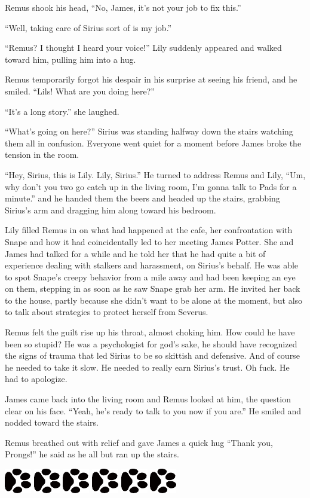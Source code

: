 \documentclass[12pt,twoside,openright]{memoir}
\newcommand{\dogPrintRule}{	
	\begin{center}
		\hspace{.5em}
		\includegraphics[angle=60]{dogprint.pdf}
		\hspace{.5em}
		\includegraphics[angle=120]{dogprint.pdf}
		\hspace{.5em}
		\includegraphics[angle=60]{dogprint.pdf}
		\hspace{.5em}
		\includegraphics[angle=120]{dogprint.pdf}
		\hspace{.5em}
		\includegraphics[angle=60]{dogprint.pdf}
		\hspace{.5em}
		\includegraphics[angle=120]{dogprint.pdf}
		\hspace{.5em}
	\end{center}
}
\begin{document}
Remus shook his head, ``No, James, it's not your job to fix this.''

``Well, taking care of Sirius sort of is my job.''

``Remus? I thought I heard your voice!'' Lily suddenly appeared and walked toward him, pulling him into a hug. 

Remus temporarily forgot his despair in his surprise at seeing his friend, and he smiled. ``Lils! What are you doing here?'' 

``It's a long story.'' she laughed. 

``What's going on here?'' Sirius was standing halfway down the stairs watching them all in confusion. Everyone went quiet for a moment before James broke the tension in the room. 

``Hey, Sirius, this is Lily. Lily, Sirius.'' He turned to address Remus and Lily, ``Um, why don't you two go catch up in the living room, I'm gonna talk to Pads for a minute.'' and he handed them the beers and headed up the stairs, grabbing Sirius's arm and dragging him along toward his bedroom.

Lily filled Remus in on what had happened at the cafe, her confrontation with Snape and how it had coincidentally led to her meeting James Potter. She and James had talked for a while and he told her that he had quite a bit of experience dealing with stalkers and harassment, on Sirius's behalf. He was able to spot Snape's creepy behavior from a mile away and had been keeping an eye on them, stepping in as soon as he saw Snape grab her arm. He invited her back to the house, partly because she didn't want to be alone at the moment, but also to talk about strategies to protect herself from Severus.

Remus felt the guilt rise up his throat, almost choking him. How could he have been so stupid? He was a psychologist for god's sake, he should have recognized the signs of trauma that led Sirius to be so skittish and defensive. And of course he needed to take it slow. He needed to really earn Sirius's trust. Oh fuck. He had to apologize.

James came back into the living room and Remus looked at him, the question clear on his face. ``Yeah, he's ready to talk to you now if you are.'' He smiled and nodded toward the stairs. 

Remus breathed out with relief and gave James a quick hug ``Thank you, Prongs!'' he said as he all but ran up the stairs.

\dogPrintRule
\end{document}
